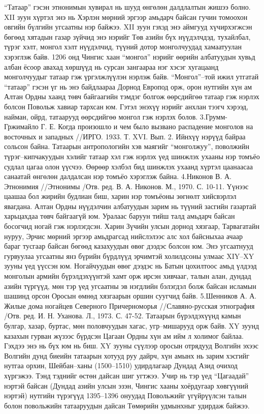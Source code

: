 “Татаар” гэсэн этнонимын хувирал нь шууд өнгөлөн далдлалтын жишээ болно. XII зуун хүртэл энэ нь Хэрлэн мөрний эргээр амьдарч байсан гучин томоохон овгийн бүлгийн угсаатны нэр байжээ. XII зуун гэхэд энэ аймгууд хүчирхэгжсэн бөгөөд хятадын газар зүйчид энэ нэрийг Төв азийн бүх нүүдэлчдэд, тухайлбал, түрэг хэлт, монгол хэлт нүүдэлчид, түүний дотор монголчуудад хамаатуулан хэрэглэж байв. 1206 онд Чингис хаан “монгол” нэрийг өөрийн албатуудын хувьд албан ёсоор авахад хөршүүд нь сурсан зангаараа нэг хэсэг хугацаанд монголчуудыг татаар гэж үргэлжлүүлэн нэрлэж байв. “Монгол”–той ижил утгатай “татаар” гэсэн үг нь энэ байдлаараа Дорнод Европод орж, орон нутгийн хүн ам Алтан Ордны хаанд төвч байгаагийн тэмдэг болгож өөрсдийгөө татаар гэж нэрлэх болсон Повольж хавиар тархсан юм. Гэтэл энэхүү нэрийг анхлан тээгч хэрээд, найман, ойрд, татаарууд өөрсдийгөө монгол гэж нэрлэх болов. 3.Грумм-Гржимайло Г. Е. Когда произошло и чем было вызвано распадение монголов на восточных и западных //ИРГО. 1933. Т. XVI. Вып. 2.
Ийнхүү нэрүүд байраа сольсон байна. Татаарын антропологийн хэв маягийг “монголжуу”, поволжийн түрэг–кипчакуудын хэлийг татаар хэл гэж нэрлэх үед шинжлэх ухааны нэр томъёо судлал цагаа олон үүсчээ. Өөрөөр хэлбэл бид шинжлэх ухаанд хүртэл цаанаасаа санаатай өнгөлөн далдалсан нэр томъёо хэрэглэж байна. 4.Никонов В. А. Этнонимия //Этнонимы /Отв. ред. В. А. Никонов. М., 1970. С. 10-11.
Үүнээс цаашаа бол жирийн будлиан биш, харин нэр томъёоны зөгнөлт хийсвэрлэл явагдана. Алтан Ордны нүүдэлчин албатуудын зарим нь түүний засгийн газартай харьцахдаа төвч байгаагүй юм. Уралаас баруун тийш талд амьдарч байсан босогчид ногай гэж нэрлэгдсэн. Харин Зүчийн улсын дорнод хязгаар, Тарвагатайн нуруу, Эрчис мөрний эргээр амьдрагсад нийслэлээс алс хол байсныхаа ачаар бараг тусгаар байсан бөгөөд казахуудын өвөг дээдэс болсон юм. Энэ угсаатнууд гурвуулаа угсаатны янз бүрийн бүрдлүүд эрчимтэй холилдсоны улмаас XIY–XY зууны үед үүссэн юм. Ногайчуудын өвөг дээдэс нь Батын цохилтоос амьд үлдээд монголын армийн бүрэлдэхүүнтэй хамт орж ирсэн хивчааг, талын алан, дундад азийн түргүүд, мөн тэр үед угсаатны эв нэгдлийн бэлэгдэл болж байсан исламын шашинд орсон Оросын өмнөд хязгаарын оршин суугчид байв. 5.Шенников А. А. Жилые дома ногайцев Северного Причерноморья //Славяно-русская этнография /Отв. ред. И. Н. Уханова. Л., 1973. С. 47-52.
Татаарын бүрэлдэхүүнд камын булгар, хазар, буртас, мөн половчуудын хагас, угр–мишарууд орж байв. XY зуунд казахын гурван жүзээс бүрдсэн Цагаан Ордны хүн ам ийм л холимог байлаа. Гэхдээ энэ нь бүх юм нь биш.
XY зууны сүүлээр оросын отрядууд Волгийн эхээс Волгийн дунд биеийн татаарын хотууд руу дайрч, хүн амынх нь зарим хэсгийг нутгаа орхин, Шейбан–ханы (1500–1510) удирдлагаар Дундад Азид очиход хүргэжээ. Тэнд тэднийг өстөн дайсан шиг угтжээ. Учир нь тэр үед “Цагаадай” нэртэй байсан (Дундад азийн улсын эзэн, Чингис хааны хоёрдугаар хөвгүүний нэртэй) нутгийн түрэгүүд 1395–1396 онуудад Повольжийг үгүйрүүлсэн талын болон повольжийн татааруудын дайсан Төмөрийн удмынхныг удирдаж байжээ.
